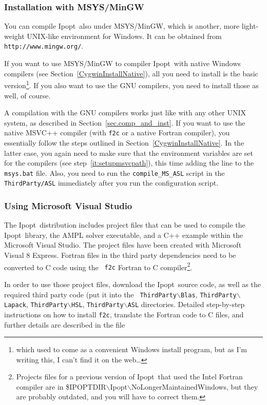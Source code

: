 \documentclass[10pt]{article}
\newcommand{\Ipopt}{{\sc Ipopt}}
\begin{document}
\subsubsection{Installation with MSYS/MinGW}\label{MinGWInstall}

You can compile \Ipopt\ also under MSYS/MinGW, which is another, more
light-weight UNIX-like environment for Windows.  It can be obtained
from \texttt{http://www.mingw.org/}.

If you want to use MSYS/MinGW to compiler \Ipopt\ with native Windows
compilers (see Section~\ref{CygwinInstallNative}), all you need to
install is the basic version\footnote{which used to come as a
  convenient Windows install program, but as I'm writing this, I can't
  find it on the web\ldots}.  If you also want to use the GNU
compilers, you need to install those as well, of course.

A compilation with the GNU compilers works just like with any other
UNIX system, as described in Section~\ref{sec.comp_and_inst}.  If you
want to use the native MSVC++ compiler (with {\tt f2c} or a native
Fortran compiler), you essentially follow the steps outlined in
Section~\ref{CygwinInstallNative}.  In the latter case, you again need
to make sure that the environment variables are set for the compilers
(see step~\ref{it:setupmsvcpath}), this time adding the line to the
{\tt msys.bat} file.  Also, you need to run the
\texttt{compile\_MS\_ASL} script in the \texttt{ThirdParty/ASL}
immediately after you run the configuration script.

\subsubsection{Using Microsoft Visual Studio}\label{VisualStudioInstall}

The \Ipopt\ distribution includes project files that can be used to
compile the \Ipopt\ library, the AMPL solver executable, and a C++
example within the Microsoft Visual Studio.  The project files have
been created with Microsoft Visual 8 Express.  Fortran files in the
third party dependencies need to be converted to C code using the {\tt
  f2c} Fortran to C compiler\footnote{Projects files for a previous
  version of \Ipopt\ that used the Intel Fortran compiler are in
  {\$IPOPTDIR$\backslash$Ipopt$\backslash$NoLongerMaintainedWindows},
  but they are probably outdated, and you will have to correct them.}.

In order to use those project files, download the \Ipopt\ source code,
as well as the required third party code (put it into the {\tt
  ThirdParty$\backslash$Blas}, {\tt ThirdParty$\backslash$Lapack},
{\tt ThirdParty$\backslash$HSL}, {\tt  ThirdParty$\backslash$ASL}
directories.  Detailed step-by-step instructions on how to install
{\tt f2c}, translate the Fortran code to C files, and further details
are described in the file
\end{document}
